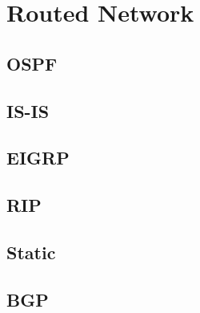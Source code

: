 \section{Routed Network}

\subsection{OSPF}
\subsection{IS-IS}
\subsection{EIGRP}
\subsection{RIP}
\subsection{Static}
\subsection{BGP}
